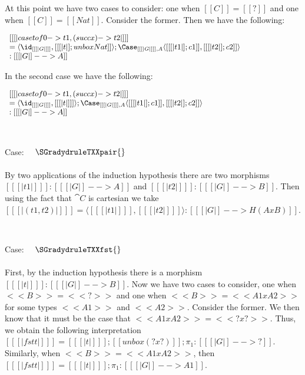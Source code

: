 \begin{description}
    At this point we have two cases to consider: one when $[[C]] = [[?]]$ and one when $[[C]] = [[Nat]]$.  Consider the former.
    Then we have the following:
    \begin{center}
      \begin{math}\small
        \begin{array}{lll}
          [[ [| case t of 0 -> t1, (succ x) -> t2 |] ]] \\
          = \langle \id_{[[ [| G |] ]]}, [[ [| t |];unbox Nat ]] \rangle;\Case_{[[ [| G |] ]],A}\langle [[ [| t1 |];c1 ]],[[ [| t2 |];c2 ]] \rangle\\
          : [[ [| G |] --> A ]]
        \end{array}
      \end{math}
    \end{center}
    In the second case we have the following:
    \begin{center}
      \begin{math}\small
        \begin{array}{lll}
          [[ [| case t of 0 -> t1, (succ x) -> t2 |] ]] \\
          = \langle \id_{[[ [| G |] ]]}, [[ [| t |] ]] \rangle;\Case_{[[ [| G |] ]],A}\langle [[ [| t1 |];c1 ]],[[ [| t2 |];c2 ]] \rangle \\
          : [[ [| G |] --> A ]]
        \end{array}
      \end{math}
    \end{center}

    \ \\
  \item Case: $\quad \SGradydruleTXXpair{}$\\
    \\
    \noindent
    By two applications of the induction hypothesis there are two morphisms
    $[[ [| t1 |] ]] : [[ [| G |] --> A]]$ and $[[ [| t2 |] ]] : [[ [| G |] --> B]]$.
    Then using the fact that $\cat{C}$ is cartesian we take
    $[[ [| (t1 , t2) |] ]] = \langle [[ [| t1 |] ]] , [[ [| t2 |] ]] \rangle : [[ [| G |] --> H(A x B)]]$.

    \ \\
  \item Case: $\quad \SGradydruleTXXfst{}$\\
    \\
    \noindent
    First, by the induction hypothesis there is a morphism $[[ [| t |] ]] : [[ [| G |] --> B]]$.
    Now we have two cases to consider, one when $<<B>> = <<?>>$ and one when $<<B>> = <<A1 x A2>>$
    for some types $<<A1>>$ and $<<A2>>$.  Consider the former.  We then know that it must
    be the case that $<<A1 x A2>> = <<? x ?>>$.  Thus, we obtain the following interpretation
    $[[ [| fst t |] ]] = [[ [| t |] ]];[[unbox (? x ?)]];\pi_1 : [[ [| G |] --> ?]]$.  Similarly,
    when $<<B>> = <<A1 x A2>>$, then
    $[[ [| fst t |] ]] = [[ [| t |] ]];\pi_1 : [[ [| G |] --> A1]]$.


\end{description}
